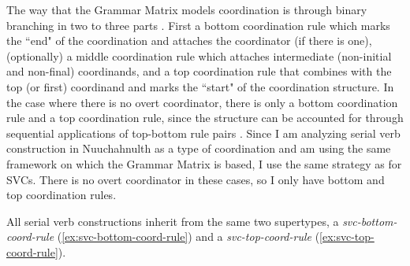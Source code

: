 The way that the Grammar Matrix models coordination is through binary branching in two to three parts \citep{drellishakbender2005}. First a bottom coordination rule which marks the ``end" of the coordination and attaches the coordinator (if there is one), (optionally) a middle coordination rule which attaches intermediate (non-initial and non-final) coordinands, and a top coordination rule that combines with the top (or first) coordinand and marks the ``start" of the coordination structure. In the case where there is no overt coordinator, there is only a bottom coordination rule and a top coordination rule, since the structure can be accounted for through sequential applications of top-bottom rule pairs \citep[p.~9]{drellishakbender2005}. Since I am analyzing serial verb construction in Nuuchahnulth as a type of coordination and am using the same framework on which the Grammar Matrix is based, I use the same strategy as \citeauthor{drellishakbender2005} for SVCs. There is no overt coordinator in these cases, so I only have bottom and top coordination rules.

All serial verb constructions inherit from the same two supertypes, a {\textit{svc-bottom-coord-rule}} (\ref{ex:svc-bottom-coord-rule}) and a {\textit{svc-top-coord-rule}} (\ref{ex:svc-top-coord-rule}).

\begin{singlespacing}
\ex \label{ex:svc-bottom-coord-rule}
\xe
\end{singlespacing}

